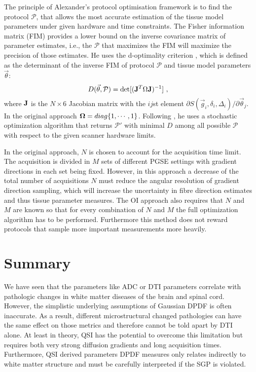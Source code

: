 The principle of Alexander's protocol optimisation framework\cite{alexander08} is to find the protocol $\mathcal{P}$, that allows the most accurate estimation of the tissue model parameters under given hardware and time constraints. The Fisher information matrix (FIM) provides a lower bound on the inverse covariance matrix of parameter estimates, i.e., the $\mathcal{P}$ that maximizes the FIM will maximize the precision of those estimates. He uses the d-optimality criterion \cite{obrien2003}, which is defined as the determinant of the inverse FIM of protocol $\mathcal{P}$ and tissue model parameters $\vec{\theta}$:
\begin{equation}
	D(\vec{\theta},\mathcal{P})=\det[(\mathbf{J}^T\Omega\mathbf{J})^{-1}]~, 
	\label{eq-optimality}
\end{equation}
where $\mathbf{J}$ is the $N\times6$ Jacobian matrix with the $ij$st element $\partial S(\vec{g}_i,\delta_i,\Delta_i) / \partial \vec{\theta}_j$. In the original approach $\mathbf{\Omega}=diag\{1,\cdots,1\}$. Following \cite{alexander2008}, he uses a stochastic optimization algorithm \cite{zelinka2000} that returns $\mathcal{P}'$ with minimal $D$ among all possible $\mathcal{P}$ with respect to the given scanner hardware limits.

In the original approach, $N$ is chosen to account for the acquisition time limit. The acquisition is divided in $M$ sets of different PGSE settings with gradient directions in each set being fixed. However, in this approach a decrease of the total number of acquisitions $N$ must reduce the angular resolution of gradient direction sampling, which will increase the uncertainty in fibre direction estimates and thus tissue parameter measures. The OI approach also requires that $N$ and $M$ are known so that for every combination of $N$ and $M$ the full optimization algorithm has to be performed. Furthermore this method does not reward protocols that sample more important measurements more heavily.
\section{Summary}
We have seen that the parameters like ADC or DTI parameters correlate with pathologic changes in white matter diseases of the brain and spinal cord. However, the simplistic underlying assumptions of Gaussian DPDF is often inaccurate. As a result, different microstructural changed pathologies can have the same effect on those metrics and therefore cannot be told apart by DTI alone. At least in theory, QSI has the potential to overcome this limitation but requires both very strong diffusion gradients and long acquisition times. Furthermore, QSI derived parameters DPDF measures only relates indirectly to white matter structure and must be carefully interpreted if the SGP is violated.


